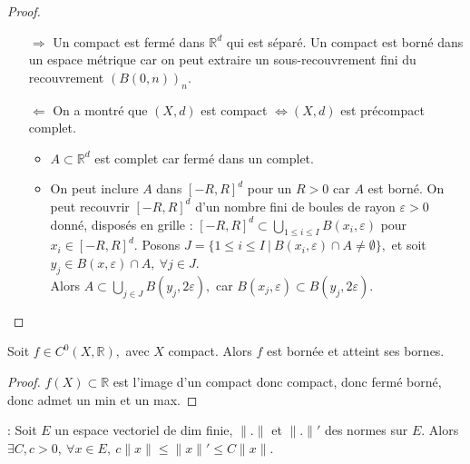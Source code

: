 \begin{proof}
    \begin{itemize}
        \item[$\Rightarrow$] Un compact est fermé dans $\mathbb{R}^d$ qui est séparé. Un compact est borné dans un espace métrique car on peut extraire un sous-recouvrement fini du recouvrement $(B(0,n))_n$.
        \item[$\Leftarrow$] On a montré que $(X,d)$ est compact $\Leftrightarrow (X,d)$ est précompact complet.
            \begin{itemize}
                \item $A\subset \mathbb{R} ^d$ est complet car fermé dans un complet.
                \item On peut inclure $A$ dans $[-R,R]^d $ pour un $R>0$ car $A$ est borné. On peut recouvrir $[-R,R]^d$ d'un nombre fini de boules de rayon $\varepsilon >0$ donné, disposés en grille : $[-R,R]^d\subset \bigcup\limits_{1\le i\le I} B(x_i,\varepsilon )$ pour $x_i\in [-R,R]^d.$ Posons $J=\{1\le i\le I\ |\ B(x_i,\varepsilon )\cap A\neq \emptyset \} ,$ et soit $y_j\in B(x,\varepsilon )\cap A,\ \forall j\in J.$ \\
                Alors $A\subset \bigcup\limits_{j\in J} B(y_j,2\varepsilon ),$ car $B(x_j, \varepsilon )\subset B(y_j, 2\varepsilon ).$
            \end{itemize}
    \end{itemize}
\end{proof}
\begin{corollaire}
    Soit $f\in C^0(X,\mathbb{R} ),$ avec $X$ compact. Alors $f$ est bornée et atteint ses bornes.
\end{corollaire}
\begin{proof}
    $f(X)\subset \mathbb{R} $ est l'image d'un compact donc compact, donc fermé borné, donc admet un min et un max.
\end{proof}
\begin{corollaire}  : Soit $E$ un espace vectoriel de dim finie, $\|.\|$ et $\|.\|'$ des normes sur $E.$ Alors $\exists C,c>0,\ \forall x\in E,\ c\|x\|\le \|x\|'\le C\|x\|. $
\end{corollaire}
